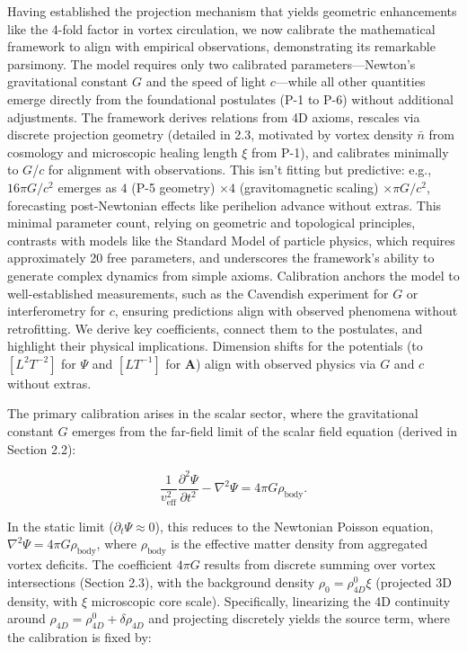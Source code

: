 Having established the projection mechanism that yields geometric enhancements like the 4-fold factor in vortex circulation, we now calibrate the mathematical framework to align with empirical observations, demonstrating its remarkable parsimony. The model requires only two calibrated parameters---Newton's gravitational constant $G$ and the speed of light $c$---while all other quantities emerge directly from the foundational postulates (P-1 to P-6) without additional adjustments. The framework derives relations from 4D axioms, rescales via discrete projection geometry (detailed in 2.3, motivated by vortex density $\bar{n}$ from cosmology and microscopic healing length $\xi$ from P-1), and calibrates minimally to $G$/$c$ for alignment with observations. This isn't fitting but predictive: e.g., $16\pi G/c^2$ emerges as $4$ (P-5 geometry) $\times 4$ (gravitomagnetic scaling) $\times \pi G/c^2$, forecasting post-Newtonian effects like perihelion advance without extras. This minimal parameter count, relying on geometric and topological principles, contrasts with models like the Standard Model of particle physics, which requires approximately 20 free parameters, and underscores the framework's ability to generate complex dynamics from simple axioms. Calibration anchors the model to well-established measurements, such as the Cavendish experiment for $G$ or interferometry for $c$, ensuring predictions align with observed phenomena without retrofitting. We derive key coefficients, connect them to the postulates, and highlight their physical implications. Dimension shifts for the potentials (to $[L^2 T^{-2}]$ for $\Psi$ and $[L T^{-1}]$ for $\mathbf{A}$) align with observed physics via $G$ and $c$ without extras.

The primary calibration arises in the scalar sector, where the gravitational constant $G$ emerges from the far-field limit of the scalar field equation (derived in Section 2.2):

\[
\frac{1}{v_{\text{eff}}^2} \frac{\partial^2 \Psi}{\partial t^2} - \nabla^2 \Psi = 4\pi G \rho_{\text{body}}.
\]

In the static limit ($\partial_t \Psi \approx 0$), this reduces to the Newtonian Poisson equation, $\nabla^2 \Psi = 4\pi G \rho_{\text{body}}$, where $\rho_{\text{body}}$ is the effective matter density from aggregated vortex deficits. The coefficient $4\pi G$ results from discrete summing over vortex intersections (Section 2.3), with the background density $\rho_0 = \rho_{4D}^0 \xi$ (projected 3D density, with $\xi$ microscopic core scale). Specifically, linearizing the 4D continuity around $\rho_{4D} = \rho_{4D}^0 + \delta \rho_{4D}$ and projecting discretely yields the source term, where the calibration is fixed by:


